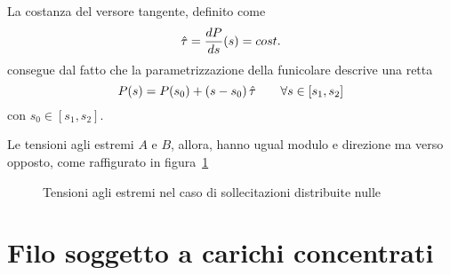 La costanza del versore tangente, definito come
\[
 \hat{\tau} = \dfrac{dP}{ds}(s) = cost.
\]
consegue dal fatto che la parametrizzazione della funicolare descrive una retta
\[
 P(s) = P(s_0) + (s - s_0 )\,\hat{\tau}\qquad \forall s\in[s_1, s_2]
\]
con $s_0\in[s_1, s_2]$.

Le tensioni agli estremi $A$ e $B$, allora, hanno ugual modulo e direzione ma verso opposto, come raffigurato in figura~\ref{fig:tensioni_forza_nulla}

\begin{figure}
 \centering
 \caption{Tensioni agli estremi nel caso di sollecitazioni distribuite nulle}
 \label{fig:tensioni_forza_nulla}
\end{figure}


\section{Filo soggetto a carichi concentrati}


